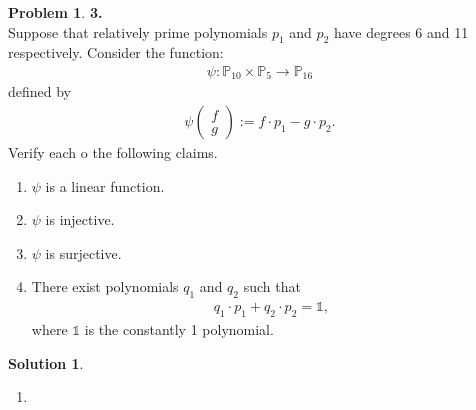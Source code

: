 \documentclass{article}
\theoremstyle{definition}
\newtheorem*{prob*}{Problem}
\newtheorem*{sln*}{Solution}
\begin{document}
\begin{prob*}\textbf{3. }\\ 
	
	Suppose that relatively prime polynomials $p_1$ and $p_2$ have degrees 6 and 11 respectively. Consider the function:
	\begin{align*}
	\psi : \mathbb{P}_{10} \times \mathbb{P}_5 \to \mathbb{P}_{16}
	\end{align*}
	defined by
	\begin{align*}
	\psi \begin{pmatrix}
	f\\g
	\end{pmatrix} := f \cdot p_1 - g \cdot p_2.
	\end{align*}
	Verify each o the following claims.
	\begin{enumerate}
		\item $\psi$ is a linear function.
		\item $\psi$ is injective.
		\item $\psi$ is surjective.
		\item There exist polynomials $q_1$ and $q_2$ such that
		\begin{align*}
		q_1 \cdot p_1 + q_2 \cdot p_2 = \mathbb{1},
		\end{align*}
		where $\mathbb{1}$ is the constantly 1 polynomial.
	\end{enumerate}



\begin{sln*}
	$\,$\\
	\begin{enumerate}
		\item 
	

\end{enumerate}
\end{sln*}
\end{prob*}
\end{document}
